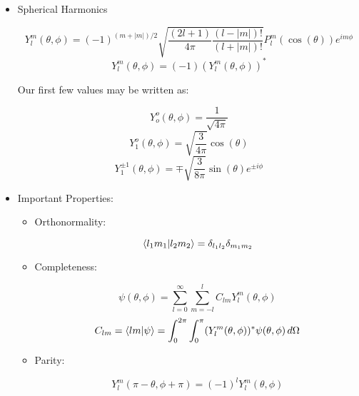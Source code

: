 \begin{itemize}
\begin{itemize}
      \item Spherical Harmonics

        $$Y_l^m(\theta,\phi)=(-1)^{(m+|m|)/2}\sqrt{\frac{(2l+1)}{4\pi}\frac{(l-|m|)!}{(l+|m|)!}}P_l^m(\cos(\theta))e^{im\phi}$$
        $$Y_l^m(\theta,\phi)=(-1)(Y_l^m(\theta,\phi))^*$$

        Our first few values may be written as:

        $$Y_o^o(\theta,\phi)=\frac{1}{\sqrt{4\pi}}$$
        $$Y_1^o(\theta,\phi)=\sqrt{\frac{3}{4\pi}}\cos(\theta)$$
        $$Y_1^{\pm1}(\theta,\phi)=\mp\sqrt{\frac{3}{8\pi}}\sin(\theta)e^{\pm i\phi}$$

      \item Important Properties:

        \begin{itemize}

          \item Orthonormality:

            $$\bra{l_1m_1}\ket{l_2m_2}=\delta_{l_1l_2}\delta_{m_1m_2}$$

          \item Completeness:

            $$\psi(\theta,\phi)=\sum_{l=0}^{\infty}\sum_{m=-l}^l C_{lm}Y_l^m(\theta,\phi)$$
            $$C_{lm}=\bra{lm}\ket{\psi}=\int_0^{2\pi}\int_0^{\pi}(Y_l^m(\theta,\phi))^*\psi(\theta,\phi)\,d\Omega$$

          \item Parity:

            $$Y_l^m(\pi-\theta,\phi+\pi)=(-1)^lY_l^m(\theta,\phi)$$

        \end{itemize}

    \end{itemize}

\end{itemize}



